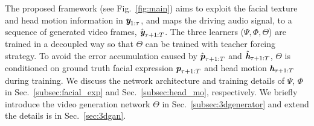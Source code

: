 \documentclass[runningheads]{llncs}
\def\mathbi#1{\textbf{\em #1}}
\providecommand{\CXu}[1]{\textcolor{red}{[{\bf #1}]}}
\begin{document}
The proposed framework (see Fig.~\ref{fig:main}) aims to exploit the facial texture and head motion information in $\mathbi{y}_{1:\tau}$, and maps the driving audio signal, to a sequence of generated video frames, $\hat{\mathbi{y}}_{ \tau+1:T}$. The three learners ($\Psi, \Phi, \Theta$) are trained in a decoupled way so that $\Theta$ can be trained with teacher forcing strategy. To avoid the error accumulation caused by $\hat{\mathbi{p}}_{\tau + 1:T}$ and $\hat{\mathbi{h}}_{\tau + 1:T}$, $\Theta$ is conditioned on ground truth facial expression ${\mathbi{p}}_{\tau + 1:T}$ and head motion ${\mathbi{h}}_{\tau + 1:T}$ during training. We discuss the network architecture and training details of $\Psi$, $\Phi$ in Sec.~\ref{subsec:facial_exp} and Sec.~\ref{subsec:head_mo}, respectively. We briefly introduce the video generation network $\Theta$ in Sec.~\ref{subsec:3dgenerator} and extend the details is in Sec.~\ref{sec:3dgan}.
\end{document}
